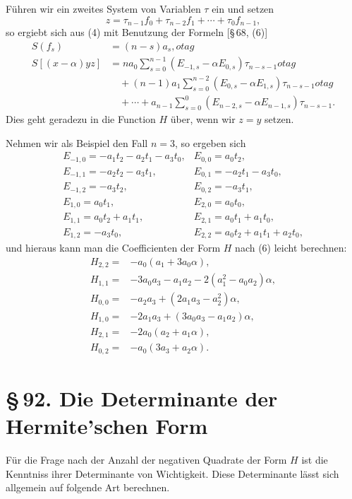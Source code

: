 \documentclass[11pt]{article}
\providecommand{\sect}[2]{\section*{\S\,#1. #2}}
\begin{document}
Führen wir ein zweites System von Variablen $\tau$ ein und setzen
\[
        z=\tau_{n-1}f_0+\tau_{n-2}f_1+\cdots+\tau_0f_{n-1},
\]
so ergiebt sich aus (4) mit Benutzung der Formeln [\S\,68, (6)]
\begin{align}
S(f_s)&=(n-s)a_s,
otag\\
S[(x-\alpha)yz]
&=na_0\sum_{s=0}^{n-1}(E_{-1,s}-\alpha E_{0,s})\tau_{n-s-1}
otag\\
&\quad +(n-1)a_1\sum_{s=0}^{n-2}(E_{0,s}-\alpha E_{1,s})\tau_{n-s-1}
otag\\
&\quad+\cdots+a_{n-1}\sum_{s=0}^{0}(E_{n-2,s}-\alpha E_{n-1,s})\tau_{n-s-1}.
\tag{6}
\end{align}
Dies geht geradezu in die Function $H$ über, wenn wir $z=y$ setzen.

Nehmen wir als Beispiel den Fall $n=3$, so ergeben sich
\[
\begin{array}{lll}
E_{-1,0}=-a_1t_2-a_2t_1-a_3t_0, & E_{0,0}=a_0t_2,\\
E_{-1,1}=-a_2t_2-a_3t_1,        & E_{0,1}=-a_2t_1-a_3t_0,\\
E_{-1,2}=-a_3t_2,                & E_{0,2}=-a_3t_1,\\
E_{1,0}=a_0t_1,                  & E_{2,0}=a_0t_0,\\
E_{1,1}=a_0t_2+a_1t_1,           & E_{2,1}=a_0t_1+a_1t_0,\\
E_{1,2}=-a_3t_0,                 & E_{2,2}=a_0t_2+a_1t_1+a_2t_0,
\end{array}
\]
und hieraus kann man die Coefficienten der Form $H$ nach (6) leicht berechnen:
\[
\begin{array}{rl}
H_{2,2}={}&-a_0(a_1+3a_0\alpha),\\
H_{1,1}={}&-3a_0a_3-a_1a_2-2(a_1^2-a_0a_2)\alpha,\\
H_{0,0}={}&-a_2a_3+(2a_1a_3-a_2^2)\alpha,\\
H_{1,0}={}&-2a_1a_3+(3a_0a_3-a_1a_2)\alpha,\\
H_{2,1}={}&-2a_0(a_2+a_1\alpha),\\
H_{0,2}={}&-a_0(3a_3+a_2\alpha).
\end{array}
\]

\sect{92}{Die Determinante der Hermite'schen Form}

Für die Frage nach der Anzahl der negativen Quadrate der Form $H$ ist die Kenntniss ihrer Determinante von Wichtigkeit. Diese Determinante lässt sich allgemein auf folgende Art berechnen.
\end{document}
